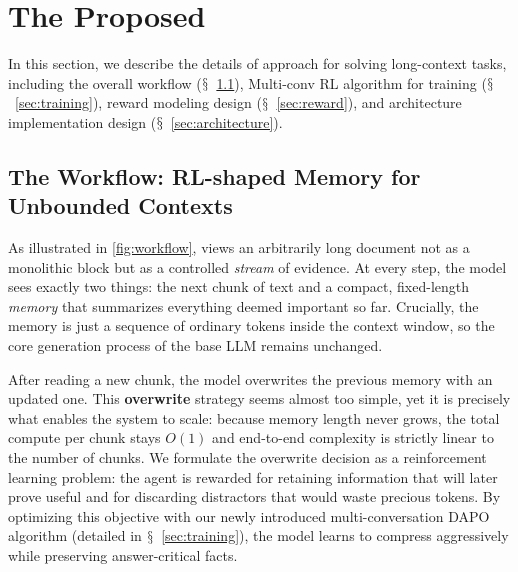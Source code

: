
\section{The Proposed \method}

In this section, we describe the details of \method approach for solving long-context tasks, including the overall workflow ($\mathsection$~\ref{sec:workflow}), Multi-conv RL algorithm for training \method ($\mathsection$~\ref{sec:training}), reward modeling design ($\mathsection$~\ref{sec:reward}), and architecture implementation design ($\mathsection$~\ref{sec:architecture}).

\subsection{The \method Workflow: RL-shaped Memory for Unbounded Contexts}
\label{sec:workflow}

As illustrated in \autoref{fig:workflow}, \method views an arbitrarily long document not as a monolithic block but as a controlled {\it stream} of evidence.
At every step, the model sees exactly two things: the next chunk of text and a compact, fixed-length \textit{memory} that summarizes everything deemed important so far.
Crucially, the memory is just a sequence of ordinary tokens inside the context window, so the core generation process of the base LLM remains unchanged.

After reading a new chunk, the model overwrites the previous memory with an updated one.
This \textbf{overwrite} strategy seems almost too simple, yet it is precisely what enables the system to scale:
because memory length never grows, the total compute per chunk stays $O(1)$ and end-to-end complexity is strictly linear to the number of chunks.
We formulate the overwrite decision as a reinforcement learning problem: the agent is rewarded for retaining information that will later prove useful and for discarding distractors that would waste precious tokens.
By optimizing this objective with our newly introduced multi-conversation DAPO algorithm (detailed in $\mathsection$~\ref{sec:training}), the model learns to compress aggressively while preserving answer-critical facts.

